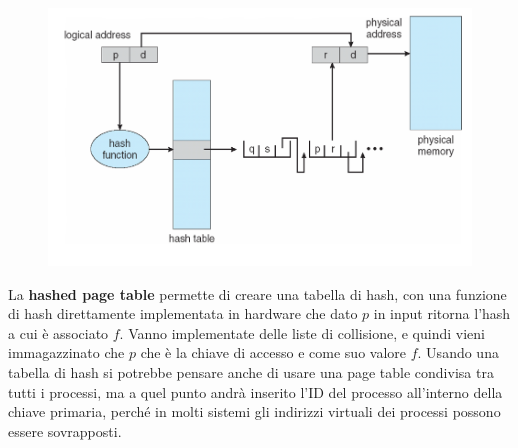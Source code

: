 \documentclass[12pt]{article}
\begin{document}
\hfill

\begin{figure}
  \centering
  \includegraphics[width=1\linewidth]{hashed-page-table.png}
\end{figure}
La \textbf{hashed page table} permette di creare una tabella di hash, con una funzione di hash direttamente implementata in hardware che dato $p$ in input ritorna l'hash a cui \`e associato $f$. Vanno implementate delle liste di collisione, e quindi vieni immagazzinato che $p$ che \`e la chiave di accesso e come suo valore $f$. Usando una tabella di hash si potrebbe pensare anche di usare una page table condivisa tra tutti i processi, ma a quel punto andr\`a inserito l'ID del processo all'interno della chiave primaria, perch\'e in molti sistemi gli indirizzi virtuali dei processi possono essere sovrapposti.

\newpage
\end{document}
